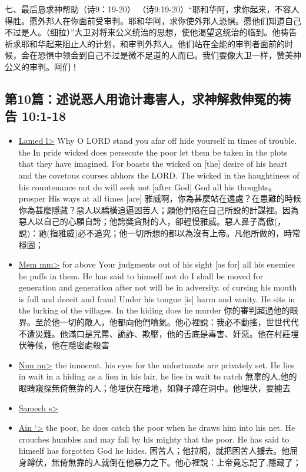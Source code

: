 \begin{itemize}
七、最后恳求神帮助（诗9：19-20）
（诗9:19-20）“耶和华阿，求你起来，不容人得胜。愿外邦人在你面前受审判。耶和华阿，求你使外邦人恐惧。愿他们知道自己不过是人。（细拉）”大卫对将来公义统治的思想，使他渴望这统治的临到。他祷告祈求耶和华起来阻止人的计划，和审判外邦人。他们站在全能的审判者面前的时候，会在恐惧中领会到自己不过是微不足道的人而已。我们要像大卫一样，赞美神公义的审判。阿们！
\end{itemize}


\subsection{第10篇：述说恶人用诡计毒害人，求神解救伸冤的祷告  10:1-18}
\begin{itemize}
\itemsep-.45em  
\item \underline{Lamed \<l>} Why O LORD stand you afar off hide yourself in times of trouble. the In pride wicked does persecute the poor let them be taken in the plots that they have imagined. For boasts the wicked on [the] desire of his heart and the covetous courses abhors the LORD. The wicked in the haughtiness of his countenance not do will seek not [after God] God all his thoughts。 prosper His ways at all times [are]  雅威啊，你為甚麼站在遠處？在患難的時候你為甚麼隱藏？惡人以驕橫追逼困苦人；願他們陷在自己所設的計謀裡。因為惡人以自己的心願自誇；他誇獎貪財的人，卻輕慢雅威。惡人鼻子高傲(，說)：祂(指雅威)必不追究；他一切所想的都以為沒有上帝。凡他所做的，時常穩固；
\item \underline{Mem \<mm>} for above Your judgments out of his sight [as for] all his enemies he puffs in them. He has said  to himself not do I shall be moved for generation and generation after not will be in adversity. of cursing his mouth is full and deceit and fraud Under his tongue [is] harm and vanity. He sits in the lurking of the villages. In the hiding does he murder 你的審判超過他的眼界。至於他一切的敵人，他都向他們噴氣。他心裡說：我必不動搖，世世代代不遭災難。他滿口是咒罵、詭詐、欺壓，他的舌底是毒害、奸惡。他在村莊埋伏等候，他在隱密處殺害
\item \underline{Nun \<nn>} the innocent. his eyes for the unfortunate are privately set. He lies in wait in a hiding as a lion in his lair, he lies in wait to catch 無辜的人,他的眼睛窺探無倚無靠的人；他埋伏在暗地，如獅子蹲在洞中。他埋伏，要擄去
\item \underline{Samech \<s>} 
\item \underline{Ain \<`>} the poor, he does catch the poor when he draws him into his net. He crouches humbles and may fall by his mighty that the poor. He has said to himself has forgotten God he hides. 困苦人；他拉網，就把困苦人擄去。他屈身蹲伏，無倚無靠的人就倒在他暴力之下。他心裡說：上帝竟忘記了,隱藏了；

\end{itemize}
